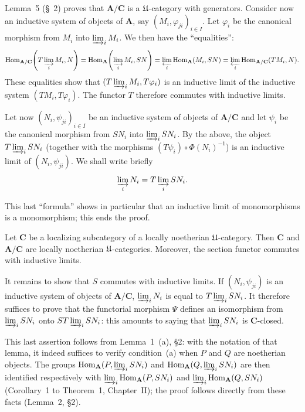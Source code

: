 Lemma~5 (\S~2) proves that $\mathbf{A}/\mathbf{C}$ is a
$\mathfrak{U}$-category with generators. Consider now an inductive system of
objects of $\mathbf{A}$, say $(M_i,\varphi_{ji})_{i\in I}$. Let
$\varphi_i$ be the canonical morphism from $M_i$ into
$\varinjlim_i M_i$. We then have the ``equalities'':
\[
\operatorname{Hom}_{\mathbf{A}/\mathbf{C}}\!\left(T\varinjlim_i M_i,N\right)
= \operatorname{Hom}_{\mathbf{A}}\!\left(\varinjlim_i M_i,SN\right)
= \varprojlim_i\operatorname{Hom}_{\mathbf{A}}(M_i,SN)
= \varprojlim_i
   \operatorname{Hom}_{\mathbf{A}/\mathbf{C}}(TM_i,N).
\]
These equalities show that $(T\varinjlim_i M_i,T\varphi_i)$ is an
inductive limit of the inductive system $(TM_i,T\varphi_i)$. The
functor $T$ therefore commutes with inductive limits.

Let now $(N_i,\psi_{ji})_{i\in I}$ be an inductive system of objects
of $\mathbf{A}/\mathbf{C}$ and let $\psi_i$ be the canonical morphism
from $SN_i$ into $\varinjlim_i SN_i$. By the above, the object
$T\varinjlim_i SN_i$ (together with the morphisms
$(T\psi_i)\circ\Phi(N_i)^{-1}$) is an
inductive limit of $(N_i,\psi_{ji})$. We shall write briefly
\[
\varinjlim_i N_i = T\varinjlim_i SN_i.
\]

This last ``formula'' shows in particular that an inductive limit
of monomorphisms is a monomorphism; this ends the proof.

\begin{corollary}
Let $\mathbf{C}$ be a localizing subcategory of a locally noetherian
$\mathfrak{U}$-category. Then $\mathbf{C}$ and $\mathbf{A}/\mathbf{C}$ are
locally noetherian $\mathfrak{U}$-categories. Moreover, the section functor
commutes with inductive limits.
\end{corollary}

It remains to show that $S$ commutes with inductive limits. If
$(N_i,\psi_{ji})$ is an inductive system of objects of
$\mathbf{A}/\mathbf{C}$, $\varinjlim_i N_i$ is equal to
$T\varinjlim_i SN_i$. It therefore suffices to prove that the
functorial morphism $\Psi$ defines an isomorphism from
$\varinjlim_i SN_i$ onto $ST\varinjlim_i SN_i$: this amounts to saying
that $\varinjlim_i SN_i$ is $\mathbf{C}$-closed.

This last assertion follows from Lemma~1~(a), \S2: with the notation
of that lemma, it indeed suffices to verify condition~(a) when $P$
and $Q$ are noetherian objects. The groups
$\operatorname{Hom}_{\mathbf{A}}(P,\varinjlim_i SN_i)$ and
$\operatorname{Hom}_{\mathbf{A}}(Q,\varinjlim_i SN_i)$ are then
identified respectively with
$\varinjlim_i\operatorname{Hom}_{\mathbf{A}}(P,SN_i)$ and
$\varinjlim_i\operatorname{Hom}_{\mathbf{A}}(Q,SN_i)$ (Corollary~1 to
Theorem~1, Chapter~II); the proof follows directly from these facts
(Lemma~2, \S2).

